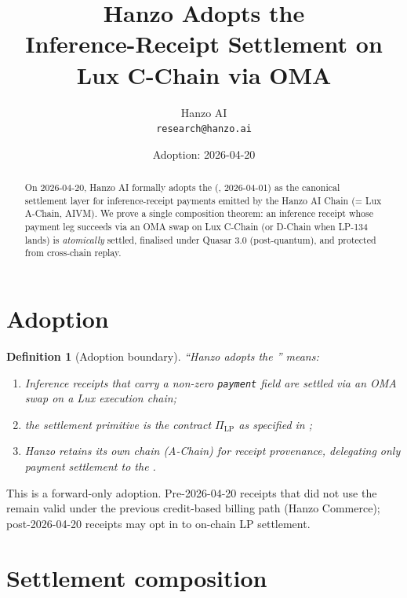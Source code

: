 \documentclass[11pt]{article}
\title{Hanzo Adopts the \\
{\large Inference-Receipt Settlement on Lux C-Chain via OMA}}
\author{Hanzo AI\\
\texttt{research@hanzo.ai}}
\date{Adoption: 2026-04-20}
\newtheorem{definition}{Definition}
\begin{document}
\maketitle

\begin{abstract}
On 2026-04-20, Hanzo AI formally adopts the 
(, 2026-04-01) as the canonical settlement layer for
inference-receipt payments emitted by the Hanzo AI Chain
(= Lux A-Chain, AIVM). We prove a single composition theorem:
an inference receipt whose payment leg succeeds via an OMA
swap on Lux C-Chain (or D-Chain when LP-134 lands) is
\emph{atomically} settled, finalised under Quasar 3.0
(post-quantum), and protected from cross-chain replay.
\end{abstract}

\tableofcontents

\section{Adoption}
\label{sec:adopt}

\begin{definition}[Adoption boundary]
\label{def:hanzo-boundary}
``Hanzo adopts the '' means:
\begin{enumerate}[nosep]
  \item Inference receipts that carry a non-zero \texttt{payment} field
        are settled via an OMA swap on a Lux execution chain;
  \item the settlement primitive is the  contract
        $\Pi_{\mathrm{LP}}$ as specified in \cite{lp-paper};
  \item Hanzo retains its own chain (A-Chain) for receipt provenance,
        delegating only payment settlement to the .
\end{enumerate}
\end{definition}

This is a forward-only adoption.  Pre-2026-04-20 receipts that did not
use the  remain valid under the previous credit-based
billing path (Hanzo Commerce); post-2026-04-20 receipts may opt in to
on-chain LP settlement.

\section{Settlement composition}
\label{sec:settle}
\end{document}
